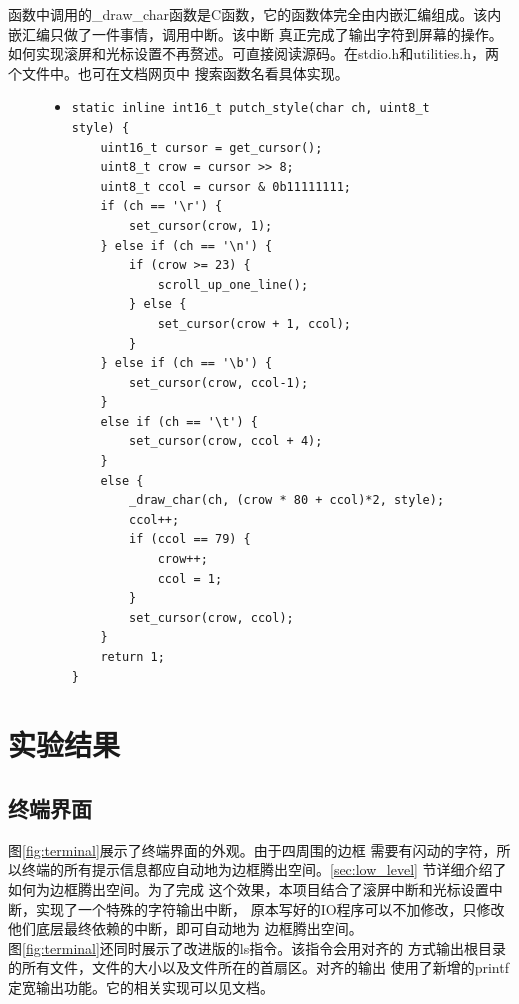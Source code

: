 \documentclass[a4paper]{article}
\begin{document}
    函数中调用的\_draw\_char函数是C函数，它的函数体完全由内嵌汇编组成。该内嵌汇编只做了一件事情，调用中断。该中断
    真正完成了输出字符到屏幕的操作。\\
    
    如何实现滚屏和光标设置不再赘述。可直接阅读源码。在stdio.h和utilities.h，两个文件中。也可在文档网页中
    搜索函数名看具体实现。
    \begin{figure}[!h]
    \begin{itemize}
    \item[] \begin{lstlisting}[language={[x86masm]Assembler}, label=lst:io, caption=自定义的底层输出函数的实现]
static inline int16_t putch_style(char ch, uint8_t style) {
    uint16_t cursor = get_cursor();
    uint8_t crow = cursor >> 8;
    uint8_t ccol = cursor & 0b11111111;
    if (ch == '\r') {
        set_cursor(crow, 1);
    } else if (ch == '\n') {
        if (crow >= 23) {
            scroll_up_one_line();
        } else {
            set_cursor(crow + 1, ccol);
        }
    } else if (ch == '\b') {
        set_cursor(crow, ccol-1);
    }
    else if (ch == '\t') {
        set_cursor(crow, ccol + 4);
    }
    else {
        _draw_char(ch, (crow * 80 + ccol)*2, style);
        ccol++;
        if (ccol == 79) {
            crow++;
            ccol = 1;
        }
        set_cursor(crow, ccol);
    }
    return 1;
}
    \end{lstlisting}
    \end{itemize}
    \end{figure}
\section{实验结果}
\subsection{终端界面}
图\ref{fig:terminal}展示了终端界面的外观。由于四周围的边框
需要有闪动的字符，所以终端的所有提示信息都应自动地为边框腾出空间。\ref{sec:low_level}
节详细介绍了如何为边框腾出空间。为了完成
这个效果，本项目结合了滚屏中断和光标设置中断，实现了一个特殊的字符输出中断，
原本写好的IO程序可以不加修改，只修改他们底层最终依赖的中断，即可自动地为
边框腾出空间。\\

图\ref{fig:terminal}还同时展示了改进版的ls指令。该指令会用对齐的
方式输出根目录的所有文件，文件的大小以及文件所在的首扇区。对齐的输出
使用了新增的printf定宽输出功能。它的相关实现可以见文档。\\ 
\end{document}
